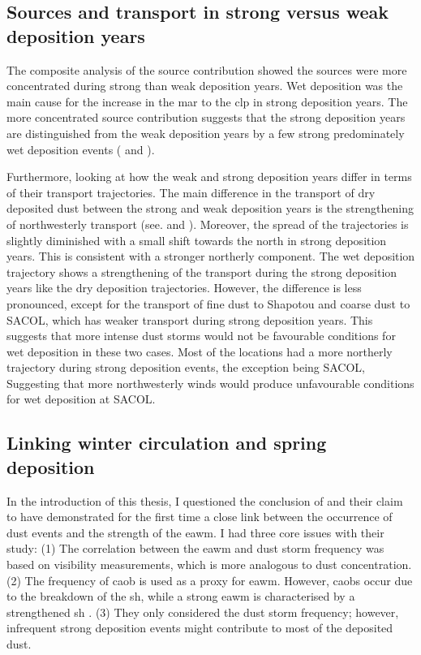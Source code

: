 \subsection{Sources and transport in strong versus weak deposition years}
The composite analysis of the source contribution showed the sources  were more concentrated during strong than weak deposition years. 
Wet deposition was the main cause for the increase in the \acrshort{mar} to the \acrshort{clp} in strong deposition years. The more concentrated source contribution suggests that the strong deposition years are distinguished from the weak deposition years by a few strong predominately wet deposition events ( and ). 

Furthermore, looking at how the weak and strong deposition years differ in terms of their transport trajectories. 
The main difference in the transport of dry deposited  dust between the strong and weak deposition years is the strengthening of northwesterly transport 
(see.  and ).
Moreover, the spread of the trajectories is slightly diminished with a small shift towards the north in strong deposition years. This is consistent with a stronger northerly component. 
The wet deposition trajectory shows a strengthening of the transport during the strong deposition years like the dry deposition trajectories. 
However, the difference is less pronounced, except for the transport of fine dust to Shapotou and coarse dust to SACOL, which has weaker transport during strong deposition years. 
This suggests that more intense dust storms would not be favourable conditions for wet deposition in these two cases.
Most of the locations had a more northerly trajectory during strong deposition events, the exception being SACOL, Suggesting that more northwesterly winds would produce unfavourable conditions for wet deposition at SACOL. 

   
\subsection{Linking winter circulation and spring deposition}
In the introduction of this thesis, I questioned the conclusion of \textcite{wyrwoll2016cold} and their claim to have demonstrated for the first time a close link between the occurrence of dust events and the strength of the \acrshort{eawm}. 
I had three core issues with their study: (1) The correlation between the \acrshort{eawm} and dust storm frequency was based on visibility measurements, which is more analogous to dust concentration.
(2) The frequency of \acrfull{caob} is used as a proxy for \acrshort{eawm}. However, \acrshort{caob}s occur due to the breakdown of the \acrfull{sh}, while a strong \acrshort{eawm} is characterised by a strengthened \acrshort{sh} \parencite{roe2009interpretation}. (3) They only considered the dust storm frequency; however, infrequent strong deposition events might contribute to most of the deposited dust. 

